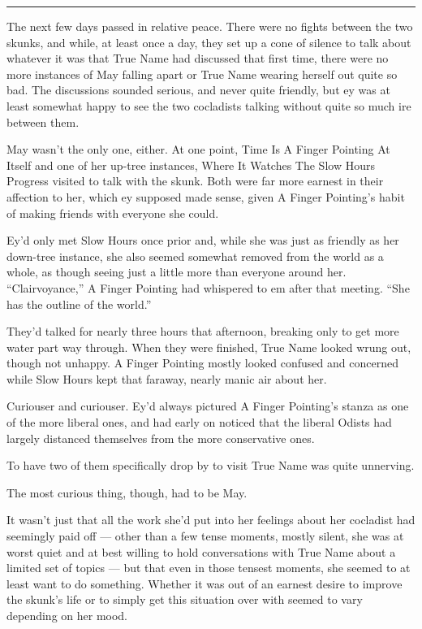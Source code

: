 \begin{center}\rule{0.5\linewidth}{0.5pt}\end{center}

The next few days passed in relative peace. There were no fights between the two skunks, and while, at least once a day, they set up a cone of silence to talk about whatever it was that True Name had discussed that first time, there were no more instances of May falling apart or True Name wearing herself out quite so bad. The discussions sounded serious, and never quite friendly, but ey was at least somewhat happy to see the two cocladists talking without quite so much ire between them.

May wasn't the only one, either. At one point, Time Is A Finger Pointing At Itself and one of her up-tree instances, Where It Watches The Slow Hours Progress visited to talk with the skunk. Both were far more earnest in their affection to her, which ey supposed made sense, given A Finger Pointing's habit of making friends with everyone she could.

Ey'd only met Slow Hours once prior and, while she was just as friendly as her down-tree instance, she also seemed somewhat removed from the world as a whole, as though seeing just a little more than everyone around her. ``Clairvoyance,'' A Finger Pointing had whispered to em after that meeting. ``She has the outline of the world.''

They'd talked for nearly three hours that afternoon, breaking only to get more water part way through. When they were finished, True Name looked wrung out, though not unhappy. A Finger Pointing mostly looked confused and concerned while Slow Hours kept that faraway, nearly manic air about her.

Curiouser and curiouser. Ey'd always pictured A Finger Pointing's stanza as one of the more liberal ones, and had early on noticed that the liberal Odists had largely distanced themselves from the more conservative ones.

To have two of them specifically drop by to visit True Name was quite unnerving.

The most curious thing, though, had to be May.

It wasn't just that all the work she'd put into her feelings about her cocladist had seemingly paid off — other than a few tense moments, mostly silent, she was at worst quiet and at best willing to hold conversations with True Name about a limited set of topics — but that even in those tensest moments, she seemed to at least want to do something. Whether it was out of an earnest desire to improve the skunk's life or to simply get this situation over with seemed to vary depending on her mood.

